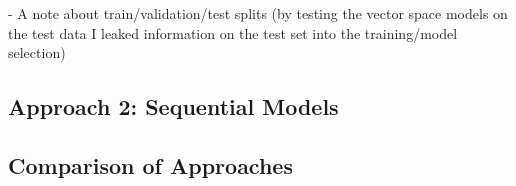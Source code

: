 %

%

%

- A note about train/validation/test splits (by testing the vector space models on the test data I leaked information on the test set into the training/model selection)


\subsection{Approach 2: Sequential Models}
\label{sub:Approach 2: Sequential Models (Results)}



\subsection{Comparison of Approaches}
